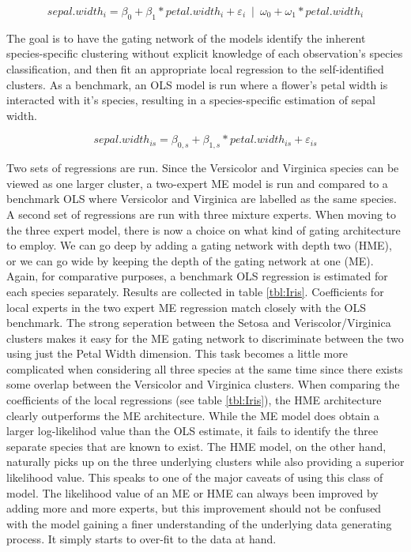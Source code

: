 \documentclass[12pt]{article}
\begin{document}
\begin{equation} \label{eq:HME_iris}
    sepal.width_{i} = \beta_{0} + \beta_{1} * petal.width_{i} + \varepsilon_{i} \enspace | \enspace \omega_{0} + \omega_{1} * petal.width_{i}
\end{equation}

The goal is to have the gating network of the 
models identify the inherent species-specific clustering without explicit
knowledge of each observation's species classification, and then fit an
appropriate local regression to the self-identified clusters. As a benchmark,
an OLS model is run where a flower's petal width is interacted with it's species,
resulting in a species-specific estimation of sepal width.

\begin{equation} \label{eq:OLS_iris}
    sepal.width_{is} = \beta_{0,s} + \beta_{1, s} * petal.width_{is} + \varepsilon_{is}
\end{equation}

Two sets of regressions are run. Since the Versicolor and Virginica species
can be viewed as one larger cluster, a two-expert ME model is run
and compared to a benchmark OLS where Versicolor and Virginica are labelled
as the same species. A second set of regressions are run with three mixture
experts. When moving to the three expert model, there is now a choice
on what kind of gating architecture to employ. We can go deep by adding 
a gating network with depth two (HME), or we can go wide by keeping the
depth of the gating network at one (ME). Again, for comparative purposes, a benchmark
OLS regression is estimated for each species separately. Results are collected in table \ref{tbl:Iris}.
Coefficients for local experts in the two expert ME regression match closely with the OLS
benchmark. The strong seperation between the Setosa and Veriscolor/Virginica
clusters makes it easy for the ME gating network to discriminate between the two using
just the Petal Width dimension. This task becomes a little more complicated when
considering all three species at the same time since there exists some overlap
between the Versicolor and Virginica clusters. When comparing the coefficients of the
local regressions (see table \ref{tbl:Iris}), the HME architecture clearly
outperforms the ME architecture. While the ME model does obtain a larger
log-likelihod value than the OLS estimate, it fails to identify the three
separate species that are known to exist. The HME model, on the other hand,
naturally picks up on the three underlying clusters while also providing a superior
likelihood value. This speaks to one of the major caveats of using this class of model.
The likelihood value of an ME or HME can always been improved by adding more and
more experts, but this improvement should not be confused with the model gaining a
finer understanding of the underlying data generating process. It simply starts to
over-fit to the data at hand.
\end{document}
